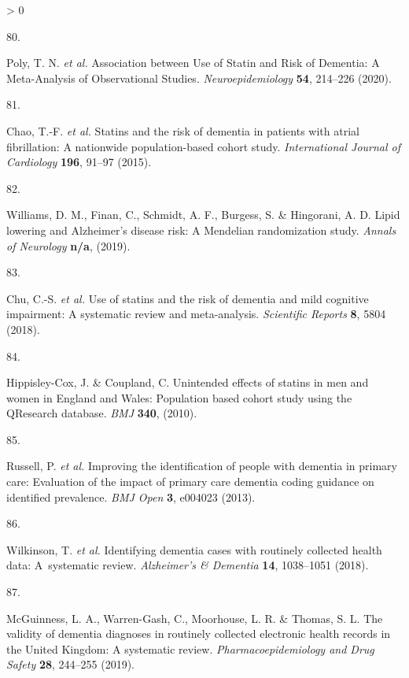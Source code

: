 \documentclass[a4paper, twoside]{templates/ociamthesis}
\newlength{\cslhangindent}
\newlength{\csllabelwidth}
\newenvironment{CSLReferences}[3] %
 {%
  \setlength{\parindent}{0pt}
  \ifodd #1 \everypar{\setlength{\hangindent}{\cslhangindent}}\ignorespaces\fi
  \ifnum #2 > 0
  \setlength{\parskip}{#2\baselineskip}
  \fi
 }%
 {}
\newcommand{\CSLLeftMargin}[1]{\parbox[t]{\maxof{\widthof{#1}}{\csllabelwidth}}{#1}}
\newcommand{\CSLRightInline}[1]{\parbox[t]{\linewidth - \csllabelwidth}{#1}}
\begin{document}
\begin{CSLReferences}{0}{0}
\leavevmode\hypertarget{ref-poly2020}{}%
\CSLLeftMargin{80. }
\CSLRightInline{Poly, T. N. \emph{et al.} Association between {Use} of {Statin} and {Risk} of {Dementia}: {A Meta}-{Analysis} of {Observational Studies}. \emph{Neuroepidemiology} \textbf{54}, 214--226 (2020).}

\leavevmode\hypertarget{ref-chao2015}{}%
\CSLLeftMargin{81. }
\CSLRightInline{Chao, T.-F. \emph{et al.} Statins and the risk of dementia in patients with atrial fibrillation: {A} nationwide population-based cohort study. \emph{International Journal of Cardiology} \textbf{196}, 91--97 (2015).}

\leavevmode\hypertarget{ref-williams}{}%
\CSLLeftMargin{82. }
\CSLRightInline{Williams, D. M., Finan, C., Schmidt, A. F., Burgess, S. \& Hingorani, A. D. Lipid lowering and {Alzheimer}'s disease risk: A {Mendelian} randomization study. \emph{Annals of Neurology} \textbf{n/a}, (2019).}

\leavevmode\hypertarget{ref-chu2018}{}%
\CSLLeftMargin{83. }
\CSLRightInline{Chu, C.-S. \emph{et al.} Use of statins and the risk of dementia and mild cognitive impairment: {A} systematic review and meta-analysis. \emph{Scientific Reports} \textbf{8}, 5804 (2018).}

\leavevmode\hypertarget{ref-hippisley-cox2010}{}%
\CSLLeftMargin{84. }
\CSLRightInline{Hippisley-Cox, J. \& Coupland, C. Unintended effects of statins in men and women in {England} and {Wales}: Population based cohort study using the {QResearch} database. \emph{BMJ} \textbf{340}, (2010).}

\leavevmode\hypertarget{ref-russell2013}{}%
\CSLLeftMargin{85. }
\CSLRightInline{Russell, P. \emph{et al.} Improving the identification of people with dementia in primary care: Evaluation of the impact of primary care dementia coding guidance on identified prevalence. \emph{BMJ Open} \textbf{3}, e004023 (2013).}

\leavevmode\hypertarget{ref-wilkinson2018}{}%
\CSLLeftMargin{86. }
\CSLRightInline{Wilkinson, T. \emph{et al.} Identifying dementia cases with routinely collected health data: {A}~systematic review. \emph{Alzheimer's \& Dementia} \textbf{14}, 1038--1051 (2018).}

\leavevmode\hypertarget{ref-mcguinness2019b}{}%
\CSLLeftMargin{87. }
\CSLRightInline{McGuinness, L. A., Warren-Gash, C., Moorhouse, L. R. \& Thomas, S. L. The validity of dementia diagnoses in routinely collected electronic health records in the {United Kingdom}: {A} systematic review. \emph{Pharmacoepidemiology and Drug Safety} \textbf{28}, 244--255 (2019).}


\end{CSLReferences}
\end{document}
